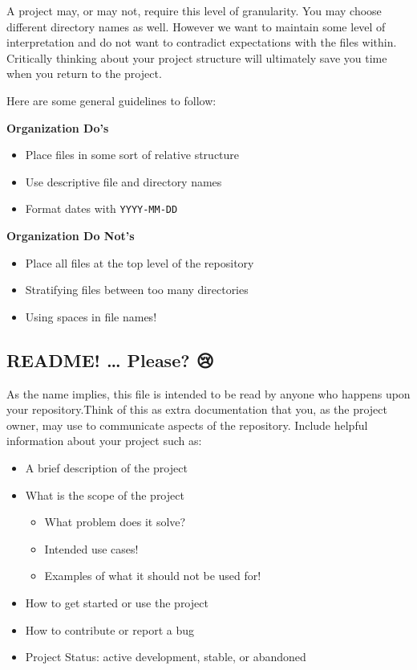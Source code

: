 \documentclass[
  letterpaper,
  DIV=11,
  numbers=noendperiod]{scrreprt}
\providecommand{\tightlist}{%
  \setlength{\itemsep}{0pt}\setlength{\parskip}{0pt}}\usepackage{longtable,booktabs,array}
\begin{document}
A project may, or may not, require this level of granularity. You may
choose different directory names as well. However we want to maintain
some level of interpretation and do not want to contradict expectations
with the files within. Critically thinking about your project structure
will ultimately save you time when you return to the project.

Here are some general guidelines to follow:

\textbf{Organization Do's}

\begin{itemize}
\tightlist
\item
  Place files in some sort of relative structure
\item
  Use descriptive file and directory names
\item
  Format dates with \texttt{YYYY-MM-DD}
\end{itemize}

\textbf{Organization Do Not's}

\begin{itemize}
\tightlist
\item
  Place all files at the top level of the repository
\item
  Stratifying files between too many directories
\item
  Using spaces in file names!
\end{itemize}

\subsection{README! \ldots{} Please? 😢}\label{readme-please}

As the name implies, this file is intended to be read by anyone who
happens upon your repository.Think of this as extra documentation that
you, as the project owner, may use to communicate aspects of the
repository. Include helpful information about your project such as:

\begin{itemize}
\tightlist
\item
  A brief description of the project
\item
  What is the scope of the project

  \begin{itemize}
  \tightlist
  \item
    What problem does it solve?
  \item
    Intended use cases!
  \item
    Examples of what it should not be used for!
  \end{itemize}
\item
  How to get started or use the project
\item
  How to contribute or report a bug
\item
  Project Status: active development, stable, or abandoned
\end{itemize}
\end{document}
